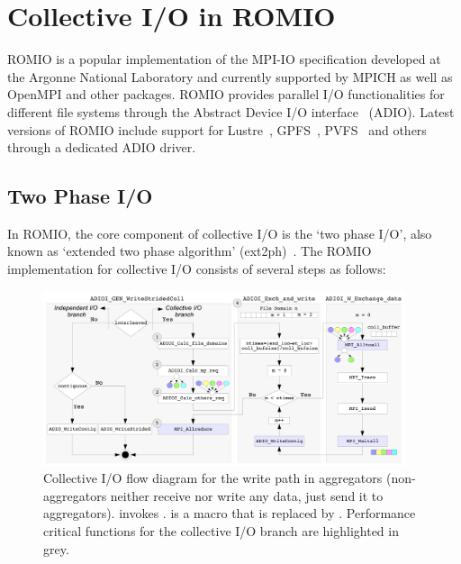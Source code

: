 \section{Collective I/O in ROMIO}
\label{sec: mpi-io}

ROMIO is a popular implementation of the MPI-IO specification developed at the Argonne National Laboratory and currently supported by MPICH as well as OpenMPI and other packages. ROMIO provides parallel I/O functionalities for different file systems through the Abstract Device I/O interface~\cite{ThakurGL96} (ADIO). Latest versions of ROMIO include support for Lustre~\cite{Ying08}, GPFS~\cite{ProstTHKW00}, PVFS~\cite{CarnsLRT} and others through a dedicated ADIO driver.

\subsection{Two Phase I/O}
\label{sec: ext2ph}

In ROMIO, the core component of collective I/O is the `two phase I/O', also known as `extended two phase algorithm' (ext2ph)~\cite{ThakurC96}. The ROMIO implementation for collective I/O consists of several steps as follows:
\begin{figure}[!htb]
  \centering
  \includegraphics[width=0.95\textwidth]{figures/ext2ph}
  \caption{Collective I/O flow diagram for the write path in aggregators (non-aggregators neither receive nor write any data, just send it to aggregators).  invokes .  is a macro that is replaced by . Performance critical functions for the collective I/O branch are highlighted in grey.}
  \label{figure: coll_io_impl}
\end{figure}

